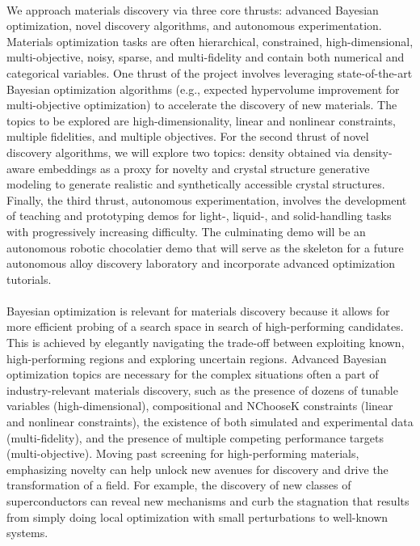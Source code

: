 \\

\noindent We approach materials discovery via three core thrusts: advanced Bayesian optimization, novel discovery algorithms, and autonomous experimentation. Materials optimization tasks are often hierarchical, constrained, high-dimensional, multi-objective, noisy, sparse, and multi-fidelity and contain both numerical and categorical variables. One thrust of the project involves leveraging state-of-the-art Bayesian optimization algorithms (e.g., expected hypervolume improvement for multi-objective optimization) to accelerate the discovery of new materials. The topics to be explored are high-dimensionality, linear and nonlinear constraints, multiple fidelities, and multiple objectives. For the second thrust of novel discovery algorithms, we will explore two topics: density obtained via density-aware embeddings as a proxy for novelty and crystal structure generative modeling to generate realistic and synthetically accessible crystal structures. Finally, the third thrust, autonomous experimentation, involves the development of teaching and prototyping demos for light-, liquid-, and solid-handling tasks with progressively increasing difficulty. The culminating demo will be an autonomous robotic chocolatier demo that will serve as the skeleton for a future autonomous alloy discovery laboratory and incorporate advanced optimization tutorials. \\

\\

\noindent Bayesian optimization is relevant for materials discovery because it allows for more efficient probing of a search space in search of high-performing candidates. This is achieved by elegantly navigating the trade-off between exploiting known, high-performing regions and exploring uncertain regions. Advanced Bayesian optimization topics are necessary for the complex situations often a part of industry-relevant materials discovery, such as the presence of dozens of tunable variables (high-dimensional), compositional and NChooseK constraints (linear and nonlinear constraints), the existence of both simulated and experimental data (multi-fidelity), and the presence of multiple competing performance  targets (multi-objective). Moving past screening for high-performing materials, emphasizing novelty can help unlock new avenues for discovery and drive the transformation of a field. For example, the discovery of new classes of superconductors can reveal new mechanisms and curb the stagnation that results from simply doing local optimization with small perturbations to well-known systems.  \\

